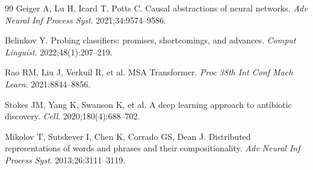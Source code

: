 \documentclass[11pt]{article}
\begin{document}
\begin{thebibliography}{99}
Geiger A, Lu H, Icard T, Potts C.
Causal abstractions of neural networks.
\textit{Adv Neural Inf Process Syst}. 2021;34:9574--9586.

Belinkov Y.
Probing classifiers: promises, shortcomings, and advances.
\textit{Comput Linguist}. 2022;48(1):207--219.

Rao RM, Liu J, Verkuil R, et al.
MSA Transformer.
\textit{Proc 38th Int Conf Mach Learn}. 2021:8844--8856.

Stokes JM, Yang K, Swanson K, et al.
A deep learning approach to antibiotic discovery.
\textit{Cell}. 2020;180(4):688--702.

Mikolov T, Sutskever I, Chen K, Corrado GS, Dean J.
Distributed representations of words and phrases and their compositionality.
\textit{Adv Neural Inf Process Syst}. 2013;26:3111--3119.

\end{thebibliography}
\end{document}
